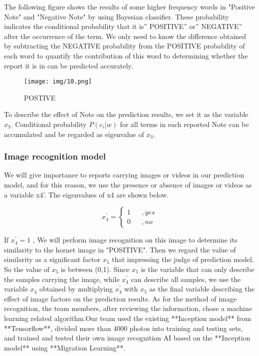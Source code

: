 \documentclass{mcmthesis}
\begin{document}
The following figure shows the results of some higher frequency words in "Positive Note" and "Negative Note" by using Bayesian classifier. These probability indicates the conditional probability that it is” POSITIVE” or” NEGATIVE” after the occurrence of the term. We only need to know the difference obtained by subtracting the NEGATIVE probability from the POSITIVE probability of each word to quantify the contribution of this word to determining whether the report it is in can be predicted accurately.

\begin{figure}[h]
    \centering
    \texttt{[image: img/10.png]}
    \caption{POSTIVE}
    \label{POSTIVE}
\end{figure}

To describe the effect of Note on the prediction results, we set it as the variable $x_3$. Conditional probability $P(c_i|w)$ for all terms in each reported Note can be accumulated and be regarded as eigenvalue of $x_3$.

\subsubsection{Image recognition model}

We will give importance to reports carrying images or videos in our prediction model, and for this reason, we use the presence or absence of images or videos as a variable x4’.
The eigenvalues of x4 are shown below.


\begin{equation}
    x_4^{'}=\left\{
    \begin{aligned}
        1 &&{,yes} \\
        0 &&{,no}
    \end{aligned}
    \right.
    \label{6}
\end{equation}

If $x_4^{'}=1$ , We will perform image recognition on this image to determine its similarity to the hornet image in "POSITIVE". Then we regard the value of similarity as a significant factor $x_5$ that impressing the judge of prediction model. So the value of $x_5$ is between (0,1). Since $x_5$  is the variable that can only describe the samples carrying the image, while $x_4^{'}$ can describe all samples, we use the variable $x_4$  obtained by multiplying $x_4^{'}$ with $x_5$  as the final variable describing the effect of image factors on the prediction results. 
As for the method of image recognition, the team members, after reviewing the information, chose a machine learning related algorithm.Our team used the existing **Inception model** from **Tensorflow**, divided more than 4000 photos into training and testing sets, and trained and tested their own image recognition AI based on the **Inception model** using **Migration Learning**.
\end{document}
